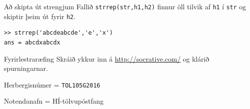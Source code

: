 \documentclass{beamer}
\begin{document}
\begin{frame}[fragile]{Að skipta út strengjum}
Fallið \texttt{strrep(str,h1,h2)} finnur öll tilvik af \texttt{h1} í \texttt{str} og skiptir þeim út fyrir \texttt{h2}.
\begin{verbatim}
>> strrep('abcdeabcde','e','x')
ans = abcdxabcdx
\end{verbatim}
\end{frame}

\begin{frame}{Fyrirlestraræfing}
Skráið ykkur inn á \url{http://socrative.com/} og klárið spurningarnar.

Herbergisnúmer = \texttt{TOL105G2016}

Notendanafn = HÍ-tölvupóstfang
\end{frame}
\end{document}
